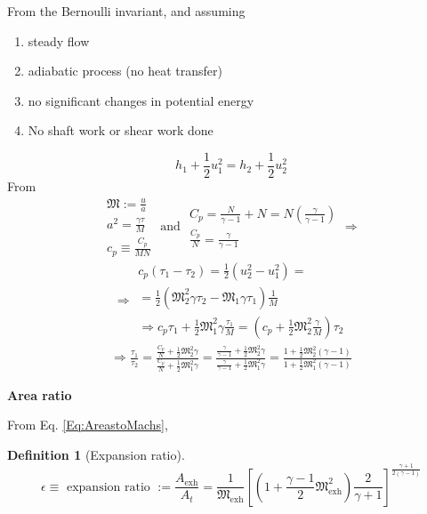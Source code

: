 \documentclass[10pt]{amsart}
\newtheorem{definition}{Definition}
\begin{document}
\begin{multicols*}{2}
From the Bernoulli invariant, and assuming
\begin{enumerate}
\item steady flow
\item adiabatic process (no heat transfer)
\item no significant changes in potential energy
  \item No shaft work or shear work done
\end{enumerate}
\begin{equation}
  h_1 + \frac{1}{2}u_1^2 = h_2 + \frac{1}{2}u_2^2
  \end{equation}
From
\[
\begin{gathered}
  \mathfrak{M} := \frac{u}{a} \\
a^2 = \frac{ \gamma \tau }{M} \\ 
 c_p \equiv \frac{ C_p}{MN}
\end{gathered} \text{ and } \begin{gathered}
  C_p = \frac{N}{\gamma -1} + N = N \left( \frac{\gamma}{\gamma -1} \right) \\
  \frac{C_p}{N} = \frac{\gamma }{ \gamma -1}  
\end{gathered} \Longrightarrow
\]
\[
\Longrightarrow 
\begin{gathered}
  c_p(\tau_1 - \tau_2) = \frac{1}{2} ( u_2^2 - u_1^2 ) = \\
  = \frac{1}{2} ( \mathfrak{M}_2^2 \gamma \tau_2 - \mathfrak{M}_1 \gamma \tau_1 ) \frac{1}{M} \\
  \Longrightarrow c_p \tau_1 + \frac{1}{2} \mathfrak{M}_1^2 \gamma \frac{\tau_1}{M} = ( c_p + \frac{1}{2} \mathfrak{M}_2^2 \frac{\gamma}{M } ) \tau_2 
  \end{gathered}
\]
\[
\begin{gathered}
  \Longrightarrow \frac{\tau_1}{\tau_2} = \frac{ \frac{C_p}{N} + \frac{1}{2} \mathfrak{M}_2^2 \gamma }{  \frac{C_p}{N} + \frac{1}{2} \mathfrak{M}_1^2 \gamma } = \frac{ \frac{\gamma}{\gamma -1} + \frac{1}{2} \mathfrak{M}_2^2 \gamma }{   \frac{\gamma}{\gamma -1} + \frac{1}{2} \mathfrak{M}_1^2 \gamma } = \frac{ 1 + \frac{1}{2} \mathfrak{M}_2^2 (\gamma -1 ) }{ 1 + \frac{1}{2} \mathfrak{M}_1^2 (\gamma -1 ) }
  \end{gathered}
\]

\textbf{Area ratio}

From Eq. \ref{Eq:AreastoMachs}, 
\begin{definition}[Expansion ratio]
  \begin{equation}
    \epsilon \equiv \text{ expansion ratio } := \frac{ A_{\text{exh}}}{ A_t} = \frac{1}{ \mathfrak{M}_{\text{exh}} } \left[ \left( 1 + \frac{\gamma -1}{2}  \mathfrak{M}_{\text{exh}}^2 \right) \frac{2}{ \gamma +1} \right]^{ \frac{\gamma +1}{ 2(\gamma -1) }}
    \end{equation}
  \end{definition}



\end{multicols*}
\end{document}
